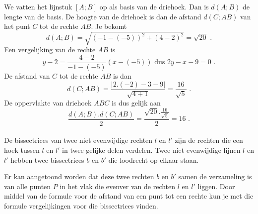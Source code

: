 \begin{voorbeeld}

We vatten het lijnstuk $[A;B]$ op als basis van de driehoek.
Dan is $d(A;B)$ de lengte van de basis.
De hoogte van de driehoek is dan de afstand $d(C;AB)$ van het punt $C$ tot de rechte $AB$.
Je bekomt
\[
d(A;B)=\sqrt { (-1-(-5))^2+(4-2)^2}=\sqrt {20} \text { .}
\]
Een vergelijking van de rechte $AB$ is
\[
y-2=\frac {4-2}{-1-(-5)}(x-(-5)) \text { dus } 2y-x-9=0 \text { .}
\]
De afstand van $C$ tot de rechte $AB$ is dan
\[
d(C;AB)=\frac {\vert 2.(-2)-3-9 \vert}{\sqrt{4+1}}=\frac {16}{\sqrt {5}} \text { .}
\]
De oppervlakte van driehoek $ABC$ is dus gelijk aan
\[
\frac {d(A;B).d(C;AB)}{2}=\frac { \sqrt {20}.\frac {16}{\sqrt {5}}}{2}=16 \text { .}
\]\\

De bissectrices van twee niet evenwijdige rechten $l$ en $l'$ zijn de rechten die een hoek tussen $l$ en $l'$ in twee gelijke delen verdelen.
Twee niet evenwijdige lijnen $l$ en $l'$ hebben twee bissectrices $b$ en $b'$ die loodrecht op elkaar staan.

\begin{center}
\end{center}




Er kan aangetoond worden dat deze twee rechten $b$ en $b'$ samen de verzameling is van alle punten $P$ in het vlak die evenver van de rechten $l$ en $l'$ liggen.
Door middel van de formule voor de afstand van een punt tot een rechte kun je met die formule vergelijkingen voor die bissectrices vinden.\\
\end{voorbeeld}

